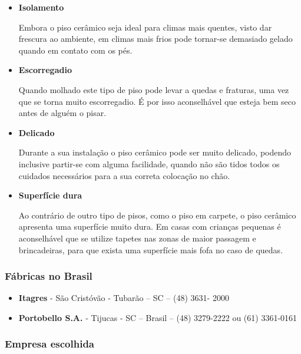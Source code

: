 	\begin{itemize}

	\item \textbf{Isolamento}

	Embora o piso cerâmico seja ideal para climas mais quentes, visto dar frescura ao ambiente, em climas mais frios pode tornar-se demasiado gelado quando em contato com os pés.

	\item \textbf{Escorregadio}
	
	Quando molhado este tipo de piso pode levar a quedas e fraturas, uma vez que se torna muito escorregadio. É por isso aconselhável que esteja bem seco antes de alguém o pisar.

	\item \textbf{Delicado}
	
	Durante a sua instalação o piso cerâmico pode ser muito delicado, podendo inclusive partir-se com alguma facilidade, quando não são tidos todos os cuidados necessários para a sua correta colocação no chão.

	\item \textbf{Superfície dura}
	
	Ao contrário de outro tipo de pisos, como o piso em carpete, o piso cerâmico apresenta uma superfície muito dura. Em casas com crianças pequenas é aconselhável que se utilize tapetes nas zonas de maior passagem e brincadeiras, para que exista uma superfície mais fofa no caso de quedas.

	\end{itemize}

\subsubsection*{\textbf{Fábricas no Brasil}}

	\begin{itemize}

	\item \textbf{Itagres} - São Cristóvão - Tubarão – SC – (48) 3631- 2000


	\item \textbf{Portobello S.A.} - Tijucas - SC – Brasil – (48) 3279-2222 ou (61) 3361-0161

	\end{itemize}


\subsubsection*{\textbf{Empresa escolhida}}

